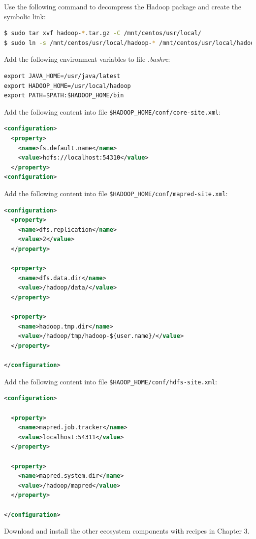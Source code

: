 Use the following command to decompress the Hadoop package and create the symbolic link:
\lstset{style=bashstyle}
\begin{lstlisting}[language=bash]
$ sudo tar xvf hadoop-*.tar.gz -C /mnt/centos/usr/local/
$ sudo ln -s /mnt/centos/usr/local/hadoop-* /mnt/centos/usr/local/hadoop
\end{lstlisting}

Add the following environment variables to file \emph{.bashrc}:
\lstset{style=bashstyle}
\begin{lstlisting}
export JAVA_HOME=/usr/java/latest
export HADOOP_HOME=/usr/local/hadoop
export PATH=$PATH:$HADOOP_HOME/bin
\end{lstlisting}

Add the following content into file \verb|$HADOOP_HOME/conf/core-site.xml|:
\lstset{style=bashstyle}
\begin{lstlisting}[language=XML]
<configuration>
  <property>
    <name>fs.default.name</name>
    <value>hdfs://localhost:54310</value>
  </property>
<configuration>
\end{lstlisting}

Add the following content into file \verb|$HADOOP_HOME/conf/mapred-site.xml|:
\lstset{style=bashstyle}
\begin{lstlisting}[language=XML]
<configuration>
  <property>
    <name>dfs.replication</name>
    <value>2</value>
  </property>

  <property>
    <name>dfs.data.dir</name>
    <value>/hadoop/data/</value>
  </property>

  <property>
    <name>hadoop.tmp.dir</name>
    <value>/hadoop/tmp/hadoop-${user.name}/</value>
  </property>

</configuration>
\end{lstlisting}

Add the following content into file \verb|$HAOOP_HOME/conf/hdfs-site.xml|:
\lstset{style=bashstyle}
\begin{lstlisting}[language=XML]
<configuration>

  <property>
    <name>mapred.job.tracker</name>
    <value>localhost:54311</value>
  </property>

  <property>
    <name>mapred.system.dir</name>
    <value>/hadoop/mapred</value>
  </property>

</configuration>
\end{lstlisting}

Download and install the other ecosystem components with recipes in Chapter 3.

